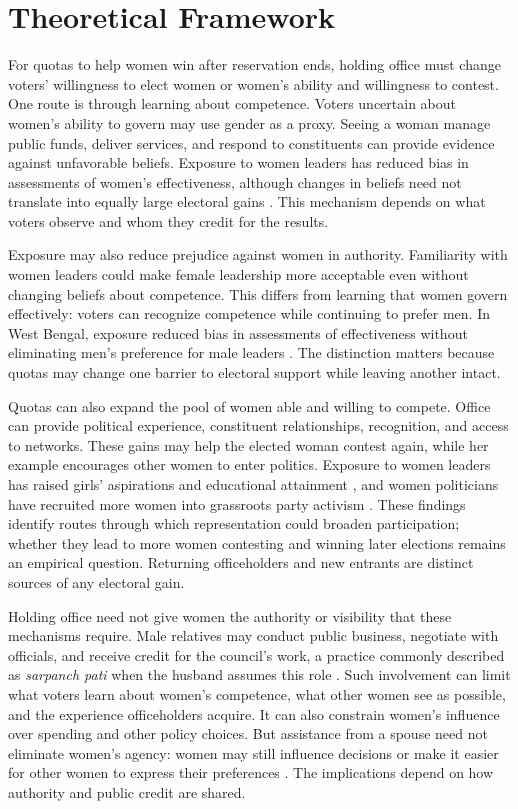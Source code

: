 \documentclass[11pt]{article}
\begin{document}
\section{Theoretical Framework}\label{sec:theory}
For quotas to help women win after reservation ends, holding office must change voters' willingness to elect women or women's ability and willingness to contest. One route is through learning about competence. Voters uncertain about women's ability to govern may use gender as a proxy. Seeing a woman manage public funds, deliver services, and respond to constituents can provide evidence against unfavorable beliefs. Exposure to women leaders has reduced bias in assessments of women's effectiveness, although changes in beliefs need not translate into equally large electoral gains \citep{beaman2009powerful}. This mechanism depends on what voters observe and whom they credit for the results.

Exposure may also reduce prejudice against women in authority. Familiarity with women leaders could make female leadership more acceptable even without changing beliefs about competence. This differs from learning that women govern effectively: voters can recognize competence while continuing to prefer men. In West Bengal, exposure reduced bias in assessments of effectiveness without eliminating men's preference for male leaders \citep{beaman2009powerful}. The distinction matters because quotas may change one barrier to electoral support while leaving another intact.

Quotas can also expand the pool of women able and willing to compete. Office can provide political experience, constituent relationships, recognition, and access to networks. These gains may help the elected woman contest again, while her example encourages other women to enter politics. Exposure to women leaders has raised girls' aspirations and educational attainment \citep{beaman2012female}, and women politicians have recruited more women into grassroots party activism \citep{goyal2024representation}. These findings identify routes through which representation could broaden participation; whether they lead to more women contesting and winning later elections remains an empirical question. Returning officeholders and new entrants are distinct sources of any electoral gain.

Holding office need not give women the authority or visibility that these mechanisms require. Male relatives may conduct public business, negotiate with officials, and receive credit for the council's work, a practice commonly described as \textit{sarpanch pati} when the husband assumes this role \citep{thakur2015brothers, brule2023actually}. Such involvement can limit what voters learn about women's competence, what other women see as possible, and the experience officeholders acquire. It can also constrain women's influence over spending and other policy choices. But assistance from a spouse need not eliminate women's agency: women may still influence decisions or make it easier for other women to express their preferences \citep{beaman2011substantive}. The implications depend on how authority and public credit are shared.
\end{document}
